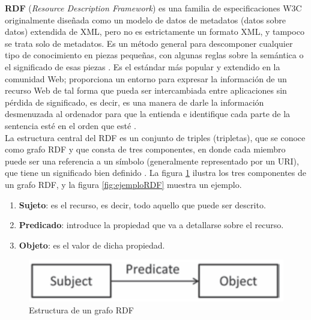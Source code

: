 \textbf{RDF} (\textit{Resource Description Framework}) es una familia de especificaciones W3C originalmente diseñada como un modelo de datos de metadatos (datos sobre datos) extendida de XML, pero no es estrictamente un formato XML, y tampoco se trata solo de metadatos. Es un método general para descomponer cualquier tipo de conocimiento en piezas pequeñas, con algunas reglas sobre la semántica o el significado de esas piezas \cite{libro-gis}. Es el estándar más popular y extendido en la comunidad Web; proporciona un entorno para expresar la información de un recurso Web de tal forma que pueda ser intercambiada entre aplicaciones sin pérdida de significado, es decir, es una manera de darle la información desmenuzada al ordenador para que la entienda e identifique cada parte de la sentencia esté en el orden que esté \cite{aplicacion}. \\

La estructura central del RDF es un conjunto de triples (tripletas), que se conoce como grafo RDF y que consta de tres componentes, en donde cada miembro puede ser una referencia a un símbolo (generalmente representado por un URI), que tiene un significado bien definido \cite{web-semantica-w3c}. La figura \ref{fig:tripleta} ilustra los tres componentes de un grafo RDF, y la figura \ref{fig:ejemploRDF} muestra un ejemplo.


\begin{enumerate}
	\item \textbf{Sujeto}: es el recurso, es decir, todo aquello que puede ser descrito.
	\item \textbf{Predicado}: introduce la propiedad que va a detallarse sobre el recurso.
	\item \textbf{Objeto}: es el valor de dicha propiedad.
\end{enumerate}

\begin{figure}[H]
	\centering
	\includegraphics[width=0.53\linewidth]{imagenes/capitulo3/tripleta1}
	\caption{Estructura de un grafo RDF}
	\label{fig:tripleta}
\end{figure}



